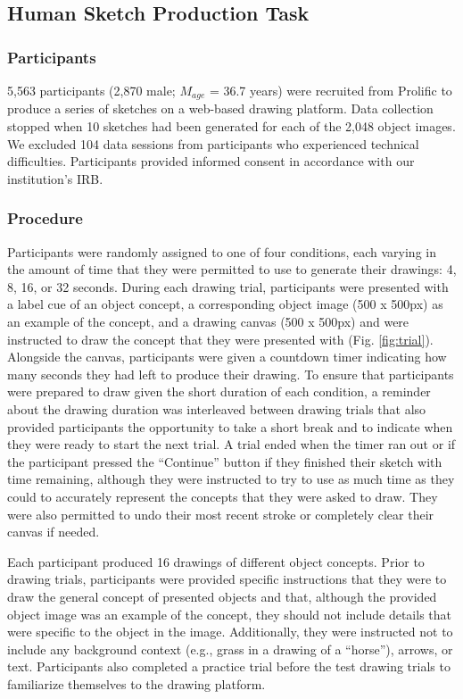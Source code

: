 \documentclass[10pt,letterpaper]{article}
\begin{document}
\subsection{Human Sketch Production Task} 
\subsubsection{Participants} 
5,563 participants (2,870 male; $M_{age}$ = 36.7 years) were recruited from Prolific to produce a series of sketches on a web-based drawing platform. 
Data collection stopped when 10 sketches had been generated for each of the 2,048 object images.
We excluded 104 data sessions from participants who experienced technical difficulties.
Participants provided informed consent in accordance with our institution’s IRB.

\subsubsection{Procedure}
Participants were randomly assigned to one of four conditions, each varying in the amount of time that they were permitted to use to generate their drawings: 4, 8, 16, or 32 seconds. 
During each drawing trial, participants were presented with a label cue of an object concept, a corresponding object image (500 x 500px) as an example of the concept, and a drawing canvas (500 x 500px) and were instructed to draw the concept that they were presented with (Fig. \ref{fig:trial}). 
Alongside the canvas, participants were given a countdown timer indicating how many seconds they had left to produce their drawing. 
To ensure that participants were prepared to draw given the short duration of each condition, a reminder about the drawing duration was interleaved between drawing trials that also provided participants the opportunity to take a short break and to indicate when they were ready to start the next trial. 
A trial ended when the timer ran out or if the participant pressed the ``Continue'' button if they finished their sketch with time remaining, although they were instructed to try to use as much time as they could to accurately represent the concepts that they were asked to draw.
They were also permitted to undo their most recent stroke or completely clear their canvas if needed. 

Each participant produced 16 drawings of different object concepts.
Prior to drawing trials, participants were provided specific instructions that they were to draw the general concept of presented objects and that, although the provided object image was an example of the concept, they should not include details that were specific to the object in the image. 
Additionally, they were instructed not to include any background context (e.g., grass in a drawing of a ``horse''), arrows, or text.
Participants also completed a practice trial before the test drawing trials to familiarize themselves to the drawing platform.
\end{document}
